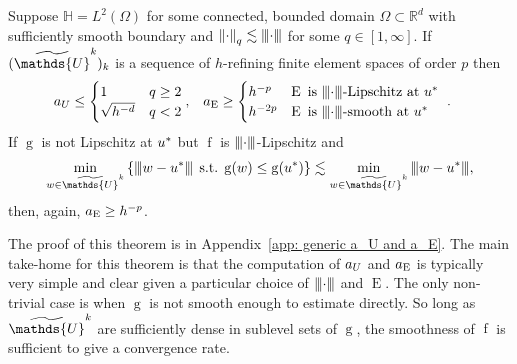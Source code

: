 \documentclass[smallextended]{svjour3}
\let\F\mathds\let\C\mathcal\newcommand{\R}{\F{R}}\newcommand{\A}{\tens{A}}
\newcommand{\norm}[1]{{\left\lVert #1 \right\rVert}}
\newcommand{\Norm}[1]{{\left\vert\kern-0.25ex\left\vert\kern-0.25ex\left\vert #1 \right\vert\kern-0.25ex\right\vert\kern-0.25ex\right\vert}}
\newcommand{\op}[1]{\operatorname{#1}}
\newcommand{\splitln}[4]{\begin{cases} #1 & #2 \\ #3 & #4\end{cases}}
\newcommand{\1}{\F{1}}
\DeclareMathOperator{\st}{\;s.t.\;}
\newcommand*{\varf}[1]{%
	\IfEqCase{#1}{%
		{0}{u}%
		{1}{v}%
		{2}{w}%
	}[u#1]%
}
\newcommand*{\Varf}[1]{%
	\IfEqCase{#1}{%
		{0}{U}%
		{1}{V}%
		{2}{W}%
	}[u#1]%
}
\newcommand*{\spcf}[1]{%
	\IfEqCase{#1}{%
		{0}{\F{U}}%
		{1}{\F{V}}%
		{2}{\F{W}}%
	}[\F{U}#1]%
}
\newcommand*{\vars}[1]{%
	\IfEqCase{#1}{%
		{0}{\alpha}%
		{1}{\beta}%
		{2}{\gamma}%
		{3}{a}%
		{4}{b}%
		{5}{c}%
	}[k#1]%
}
\newcommand{\Domain}{\Omega}\newcommand{\domain}{\omega}
\newcommand{\meshsize}{h}
\newcommand{\edit}[2]{{\ifmmode\text{\color{red}\sout{\ensuremath{#1}}}\else {\color{red} \sout{#1}}\fi} {\color{darkgreen} #2}}
\begin{document}
	\begin{theorem}\label{thm: generic a_U and a_E}
		Suppose $\F H= L^2(\Domain)$ for some \edit{compact}{connected, bounded} domain $\Domain\subset\R^d$\edit{}{ with sufficiently smooth boundary} and $\norm\cdot_q\lesssim \Norm\cdot$ for some $q\in[1,\infty]$. If $(\tilde{\spcf0}^k)_k$ is a sequence of $\meshsize$-refining finite element spaces of order $p$ then
		\begin{align*}
			\vars3_{\Varf0} &\leq \splitln{1}{q\geq 2}{\sqrt{\meshsize^{-d}}}{q<2},
			& \vars3_{\op{E}} &\geq \begin{cases}
				\meshsize^{-p} & \op{E} \text{ is $\Norm\cdot$-Lipschitz at }\varf0^*
				\\\meshsize^{-2p} & \op{E} \text{ is $\Norm\cdot$-smooth at }\varf0^*
			\end{cases}\ .
		\end{align*}
		If $\op{g}$ is not Lipschitz at $\varf0^*$ but $\op{f}$ is $\Norm\cdot$-Lipschitz and 
		$$\min_{\varf2\in\tilde{\spcf0}^k}\left\{\Norm{\varf2-\varf0^*}\st \op{g}(\varf2)\leq \op{g}(\varf0^*)\right\} \lesssim \min_{\varf2\in\tilde{\spcf0}^k}\Norm{\varf2-\varf0^*},$$
		then, again, $\vars3_{\op{E}}\geq\meshsize^{-p}$. 
	\end{theorem}
	The proof of this theorem is in Appendix~\ref{app: generic a_U and a_E}. The main take-home for this theorem is that the computation of $\vars3_{\Varf0}$ and $\vars3_{\op{E}}$ is typically very simple and clear given a particular choice of $\Norm\cdot$ and $\op{E}$. The only non-trivial case is when $\op{g}$ is not smooth enough to estimate directly. So long as $\tilde{\spcf0}^k$ are sufficiently dense in sublevel sets of $\op{g}$, the smoothness of $\op{f}$ is sufficient to give a convergence rate.
	
	
\end{document}

